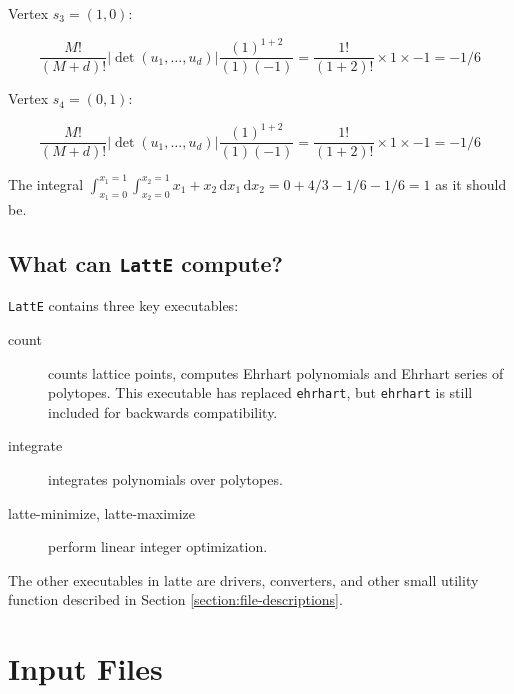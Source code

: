 \documentclass{article}
\newcommand{\latte}{{\tt LattE}\xspace}
\renewcommand\d{\,\mathrm{d}}
\begin{document}
Vertex $s_3 = (1,0)$: 
	
\begin{displaymath}
 \frac{M!}{(M+d)!} |\det(u_1, \dots, u_d)| \frac{(1)^{1+2}}{(1)(-1)} = \frac{1!}{(1+2)!} \times 1 \times -1 = -1/6
\end{displaymath}


Vertex $s_4 = (0,1):$ 


\begin{displaymath}
 \frac{M!}{(M+d)!} |\det(u_1, \dots, u_d)| \frac{(1)^{1+2}}{(1)(-1)} = \frac{1!}{(1+2)!} \times 1 \times -1 = -1/6
\end{displaymath}

The integral $\int_{x_1 = 0}^{x_1 = 1}\int_{x_2 = 0}^{x_2 = 1} x_1 +x_2  \d{x_1}\d{x_2} = 0 + 4/3 -1/6 - 1/6 = 1$ as it should be.




\subsection{What can {\tt LattE} compute?}

\latte contains three key executables:
\begin{description}
	\item[count] counts lattice points, computes Ehrhart polynomials and Ehrhart series of polytopes. This executable has replaced {\tt ehrhart}, but {\tt ehrhart} is still included for backwards compatibility.
	\item[integrate] integrates polynomials over polytopes.
	\item[latte-minimize, latte-maximize] perform linear integer optimization.
\end{description}

The other executables in latte are drivers, converters, and other small utility function described in Section \ref{section:file-descriptions}.


\section{Input Files}\label{Input Files}
\end{document}
